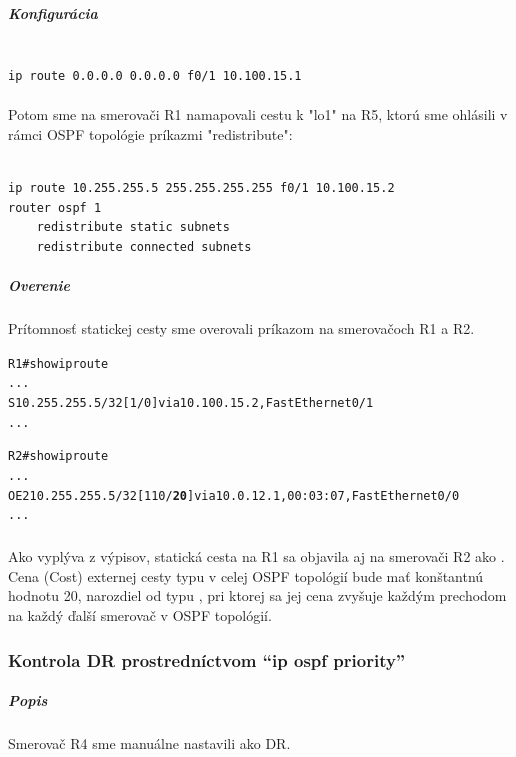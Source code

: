 \documentclass[12pt,twoside,a4paper]{article}
\begin{document}
\subparagraph{Konfigurácia}
\noindent
{\selectfont
\begin{small}
\begin{verbatim}

ip route 0.0.0.0 0.0.0.0 f0/1 10.100.15.1

\end{verbatim}
\end{small}
}

\paragraph{}
Potom sme na smerovači R1 namapovali cestu k "lo1" na R5, ktorú sme ohlásili v rámci OSPF topológie príkazmi "redistribute":

\noindent
{\selectfont
\begin{small}
\begin{verbatim}

ip route 10.255.255.5 255.255.255.255 f0/1 10.100.15.2
router ospf 1
    redistribute static subnets
    redistribute connected subnets

\end{verbatim}
\end{small}
}

\subparagraph{Overenie}
\subparagraph{}
Prítomnosť statickej cesty sme overovali príkazom  na smerovačoch R1 a R2.

\noindent
{\selectfont
\begin{small}
\begin{alltt}

R1#show ip route
...
S       10.255.255.5/32 [1/0] via 10.100.15.2, FastEthernet0/1
...




R2#show ip route
...
O E2    10.255.255.5/32 [110/\textbf{20}] via 10.0.12.1, 00:03:07, FastEthernet0/0
...
\end{alltt}
\end{small}
}

\subparagraph{}
Ako vyplýva z výpisov, statická cesta na R1 sa objavila aj na smerovači R2 ako . Cena (Cost) externej cesty typu  v celej OSPF topológií bude mať konštantnú hodnotu 20, narozdiel od typu , pri ktorej sa jej cena zvyšuje každým prechodom na každý ďalší smerovač v OSPF topológií.



\subsubsection*{Kontrola DR prostredníctvom  “ip ospf priority”}
\subparagraph{Popis}
\subparagraph{}
Smerovač R4 sme manuálne nastavili ako DR.
\end{document}
